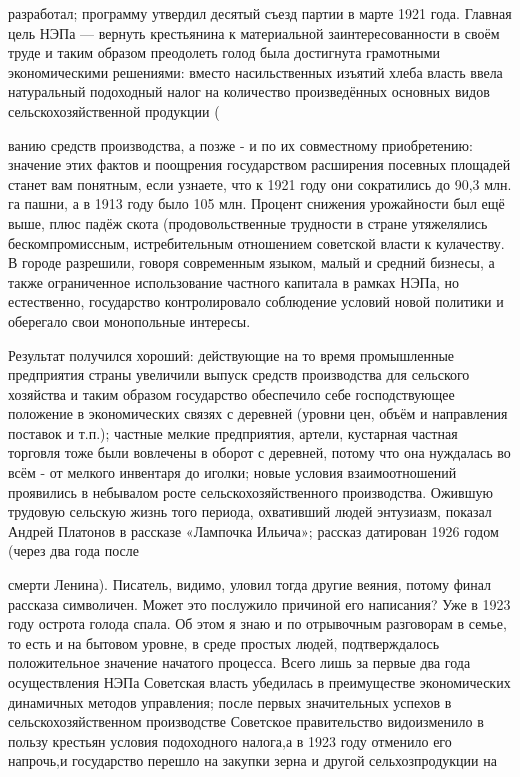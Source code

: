 \label{088-1}
разработал; программу утвердил десятый съезд партии в марте 1921 года. Главная цель НЭПа — вернуть крестьянина к материальной заинтересованности в своём труде и таким образом преодолеть голод была достигнута грамотными экономическими решениями: вместо насильственных изъятий хлеба власть ввела натуральный подоходный налог на количество произведённых основных видов сельскохозяйственной продукции (%

\label{089-1}
ванию средств производства, а позже - и по их совместному приобретению: значение этих фактов и поощрения государством расширения посевных площадей станет вам понятным, если узнаете, что к 1921 году они сократились до 90,3 млн. га пашни, а в 1913 году было 105 млн. Процент снижения урожайности был ещё выше, плюс падёж скота (продовольственные трудности в стране утяжелялись бескомпромиссным, истребительным отношением советской власти к кулачеству. В городе разрешили, говоря современным языком, малый и средний бизнесы, а также ограниченное использование частного капитала в рамках НЭПа, но естественно, государство контролировало соблюдение условий новой политики и оберегало свои монопольные интересы. 

\label{090-1}
Результат получился хороший: действующие на то время промышленные предприятия страны увеличили выпуск средств производства для сельского хозяйства и таким образом государство обеспечило себе господствующее положение в экономических связях с деревней (уровни цен, объём и направления поставок и т.п.); частные мелкие предприятия, артели, кустарная частная торговля тоже были вовлечены в оборот с деревней, потому что она нуждалась во всём - от мелкого инвентаря до иголки; новые условия взаимоотношений проявились в небывалом росте сельскохозяйственного производства. Ожившую трудовую сельскую жизнь того периода, охвативший людей энтузиазм, показал Андрей Платонов в рассказе «Лампочка Ильича»; рассказ датирован 1926 годом (через два года после

\label{091-1}
смерти Ленина). Писатель, видимо, уловил тогда другие веяния, потому финал рассказа символичен. Может это послужило причиной его написания? Уже в 1923 году острота голода спала. Об этом я знаю и по отрывочным разговорам в семье, то есть и на бытовом уровне, в среде простых людей, подтверждалось положительное значение начатого процесса. Всего лишь за первые два года осуществления НЭПа Советская власть убедилась в преимуществе экономических динамичных методов управления; после первых значительных успехов в сельскохозяйственном производстве Советское правительство видоизменило в пользу крестьян условия подоходного налога,а в 1923 году отменило его напрочь,и государство перешло на закупки зерна и другой сельхозпродукции на 

